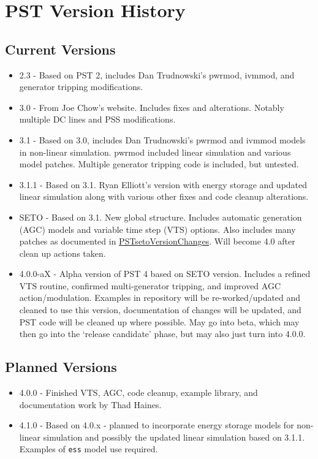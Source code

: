 \chapter{PST Version History}



\section*{Current Versions}
\begin{itemize}
\item 2.3 - Based on PST 2, includes Dan Trudnowski's pwrmod, ivmmod, and generator tripping modifications.
\item 3.0 - From Joe Chow's website. 
Includes fixes and alterations. 
Notably multiple DC lines and PSS modifications.
\item 3.1 - Based on 3.0, includes Dan Trudnowski's pwrmod and ivmmod models in non-linear simulation. 
pwrmod included linear simulation and various model patches. 
Multiple generator tripping code is included, but untested.
\item 3.1.1 - Based on 3.1. Ryan Elliott's version with energy storage and updated linear simulation along with various other fixes and code cleanup alterations. 
\item SETO - Based on 3.1. New global structure. 
Includes automatic generation (AGC) models and variable time step (VTS) options. 
Also includes many patches as documented in 
\href{https://github.com/thadhaines/MT-Tech-SETO/tree/master/researchDocs/TEX/one-offs/200709-PSTsetoVersionChanges}{PSTsetoVersionChanges}. 
% 
Will become 4.0 after clean up actions taken.
\item 4.0.0-aX - Alpha version of PST 4 based on SETO version. 
Includes a refined VTS routine, confirmed multi-generator tripping, and improved AGC action/modulation.
Examples in repository will be re-worked/updated and cleaned to use this version, 
documentation of changes will be updated, 
and PST code will be cleaned up where possible.
May go into beta, which may then go into the `release candidate' phase, but may also just turn into 4.0.0.

\end{itemize}

\section*{Planned Versions}
\begin{itemize}
\item 4.0.0 - Finished VTS, AGC, code cleanup, example library, and documentation work by Thad Haines.
\item 4.1.0 - Based on 4.0.x - planned to incorporate energy storage models for non-linear simulation and possibly the updated linear simulation based on 3.1.1. Examples of \verb|ess| model use required.
\end{itemize}